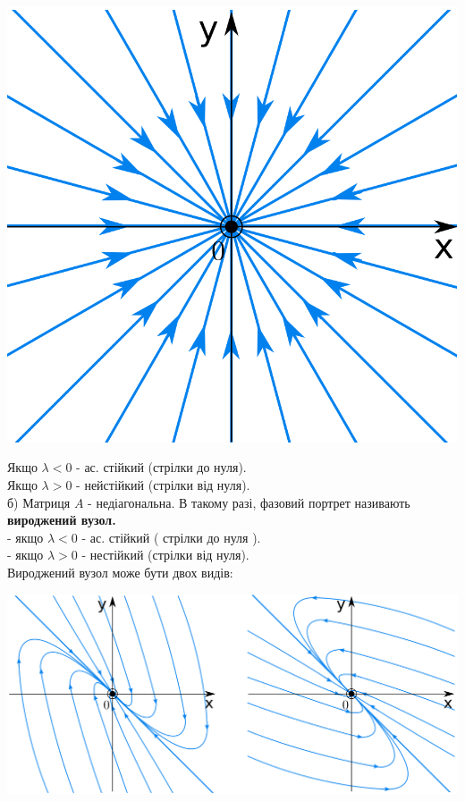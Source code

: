 \documentclass[14pt,a4paper]{scrartcl}
\theoremstyle{definition}
\theoremstyle{definition}
\theoremstyle{definition}
\begin{document}
\begin{center} \includegraphics[scale=0.3]{assets/lectures_recent-ab36e3f3.png} \end{center}


Якщо $ \lambda < 0 $ - ас. стійкий (стрілки до нуля).\\
Якщо $ \lambda > 0 $ - нейстійкий (стрілки від нуля). \\
б) Матриця $A$ - недіагональна. В такому разі, фазовий портрет називають \textbf{вироджений вузол.}\\
- якщо $ \lambda < 0 $ - ас. стійкий ( стрілки до нуля ).\\
- якщо $ \lambda > 0 $ - нестійкий (стрілки від нуля).\\
Вироджений вузол може бути двох видів:
\begin{center} \includegraphics[scale=0.25]{assets/lectures_recent-b526bf37.png} \end{center}
\end{document}
